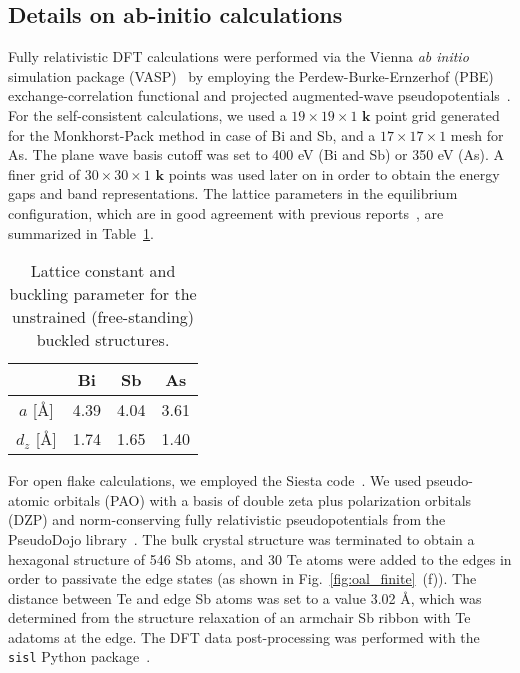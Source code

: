 \subsection{Details on ab-initio calculations}
\label{sec:DFT}
Fully relativistic DFT calculations were performed via the Vienna \emph{ab initio} simulation package (VASP)~\cite{KresseFurth96-1, KresseFurth96-2} by employing the Perdew-Burke-Ernzerhof (PBE)~\cite{PBE-1, PBE-2} exchange-correlation functional and projected augmented-wave pseudopotentials~\cite{PAW-1, PAW-2}. For the self-consistent calculations, we used a $19 \times 19 \times 1$ $\mathbf{k}$ point grid generated for the Monkhorst-Pack method in case of Bi and Sb, and a $17 \times 17 \times 1$ mesh for As. The plane wave basis cutoff was set to 400 eV (Bi and Sb) or 350 eV (As). A finer grid of $30 \times 30 \times 1$ $\mathbf{k}$ points was used later on in order to obtain the energy gaps and band representations. The lattice parameters in the equilibrium configuration, which are in good agreement with previous reports~\cite{LattParamBi, LattParamSb, LattParamAs}, are summarized in Table~\ref{tab:latt_param}.

\begin{table}[!htbp]
\centering
\begin{tabular}{| c | c | c | c |}
\hline 
& Bi & Sb & As \\
\hline
$a$ [\AA] & 4.39 & 4.04 & 3.61 \\
\hline 
$d_{z}$ [\AA] & 1.74 & 1.65 & 1.40 \\ 
\hline
\end{tabular}
\caption[Lattice constant and buckling parameter for the unstrained (free-standing) buckled structures]{Lattice constant and buckling parameter for the unstrained (free-standing) buckled structures.}
\label{tab:latt_param}
\end{table}

For open flake calculations, we employed the Siesta code~\cite{Soler_2002}. We used pseudo-atomic orbitals (PAO) with a basis of double zeta plus polarization orbitals (DZP) and norm-conserving fully relativistic pseudopotentials from the PseudoDojo library~\cite{VANSETTEN201839}. The bulk crystal structure was terminated to obtain a hexagonal structure of 546 Sb atoms, and 30 Te atoms were added to the edges in order to passivate the edge states (as shown in Fig.~\ref{fig:oal_finite}~(f)). The distance between Te and edge Sb atoms was set to a value 3.02 \AA, which was determined from the structure relaxation of an armchair Sb ribbon with Te adatoms at the edge. The DFT data post-processing was performed with the \texttt{sisl} Python package~\cite{zerothi_sisl}. 

